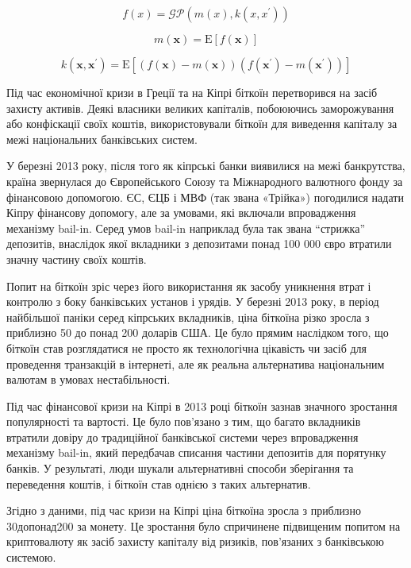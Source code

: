 \documentclass[12pt]{report}
\begin{document}
$$
f\left(x\right)=\mathcal{GP}\left(m\left(x\right),k\left(x,x^\prime\right)\right)
$$

$$
m\left(\mathbf{x}\right)=\mathrm{E}\left[f\left(\mathbf{x}\right)\right]
$$

$$
k\left(\mathbf{x},\mathbf{x}^\prime\right)=\mathrm{E}\left[\left(f\left(\mathbf{x}\right)-m\left(\mathbf{x}\right)\right)\left(f\left(\mathbf{x}^\prime\right)-m\left(\mathbf{x}^\prime\right)\right)\right]
$$

Під час економічної кризи в Греції та на Кіпрі біткоїн перетворився на засіб захисту активів. 
Деякі власники великих капіталів, побоюючись заморожування або конфіскації своїх коштів, 
використовували біткоїн для виведення капіталу за межі національних банківських систем.

У березні 2013 року, після того як кіпрські банки виявилися на межі банкрутства, 
країна звернулася до Європейського Союзу та Міжнародного валютного фонду за фінансовою допомогою. 
ЄС, ЄЦБ і МВФ (так звана «Трійка») погодилися надати Кіпру фінансову допомогу, але за умовами, 
які включали впровадження механізму bail-in. Серед умов bail-in наприклад була так звана ``стрижка'' депозитів, 
внаслідок якої вкладники з депозитами понад 100 000 євро втратили значну частину своїх коштів. 

Попит на біткоїн зріс через його використання як засобу уникнення втрат і контролю з боку банківських установ і урядів. 
У березні 2013 року, в період найбільшої паніки серед кіпрських вкладників, 
ціна біткоїна різко зросла з приблизно 50 до понад 200 доларів США. 
Це було прямим наслідком того, що біткоїн став розглядатися не просто як технологічна цікавість 
чи засіб для проведення транзакцій в інтернеті, але як реальна альтернатива національним валютам в умовах нестабільності.


Під час фінансової кризи на Кіпрі в 2013 році біткоїн зазнав значного зростання популярності та вартості. Це було пов'язано з тим, що багато вкладників втратили довіру до традиційної банківської системи через впровадження механізму bail-in, який передбачав списання частини депозитів для порятунку банків. У результаті, люди шукали альтернативні способи зберігання та переведення коштів, і біткоїн став однією з таких альтернатив.

Згідно з даними, під час кризи на Кіпрі ціна біткоїна зросла з приблизно $30 до понад $200 за монету. Це зростання було спричинене підвищеним попитом на криптовалюту як засіб захисту капіталу від ризиків, пов'язаних з банківською системою.
\end{document}
